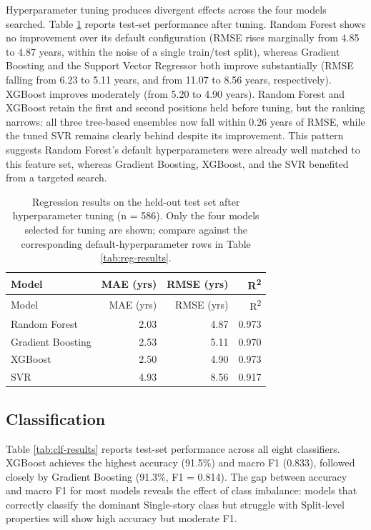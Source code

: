 \documentclass[11pt,a4paper]{article}
\begin{document}
Hyperparameter tuning produces divergent effects across the four models
searched. Table \ref{tab:reg-tuned} reports test-set performance after
tuning. Random Forest shows no improvement over its default
configuration (RMSE rises marginally from 4.85 to 4.87 years, within the
noise of a single train/test split), whereas Gradient Boosting and the
Support Vector Regressor both improve substantially (RMSE falling from
6.23 to 5.11 years, and from 11.07 to 8.56 years, respectively). XGBoost
improves moderately (from 5.20 to 4.90 years). Random Forest and XGBoost
retain the first and second positions held before tuning, but the
ranking narrows: all three tree-based ensembles now fall within 0.26
years of RMSE, while the tuned SVR remains clearly behind despite its
improvement. This pattern suggests Random Forest's default
hyperparameters were already well matched to this feature set, whereas
Gradient Boosting, XGBoost, and the SVR benefited from a targeted
search.

\begin{longtable}[]{@{}lrrr@{}}
\caption{\label{tab:reg-tuned}Regression results on the held-out test
set after hyperparameter tuning (n = 586). Only the four models selected
for tuning are shown; compare against the corresponding
default-hyperparameter rows in Table
\ref{tab:reg-results}.}\tabularnewline
\toprule\noalign{}
Model & MAE (yrs) & RMSE (yrs) & R\textsuperscript{2} \\
\midrule\noalign{}
\endfirsthead
\toprule\noalign{}
Model & MAE (yrs) & RMSE (yrs) & R\textsuperscript{2} \\
\midrule\noalign{}
\endhead
\bottomrule\noalign{}
\endlastfoot
Random Forest & 2.03 & 4.87 & 0.973 \\
Gradient Boosting & 2.53 & 5.11 & 0.970 \\
XGBoost & 2.50 & 4.90 & 0.973 \\
SVR & 4.93 & 8.56 & 0.917 \\
\end{longtable}

\subsection{Classification}\label{classification}

Table \ref{tab:clf-results} reports test-set performance across all
eight classifiers. XGBoost achieves the highest accuracy (91.5\%) and
macro F1 (0.833), followed closely by Gradient Boosting (91.3\%, F1 =
0.814). The gap between accuracy and macro F1 for most models reveals
the effect of class imbalance: models that correctly classify the
dominant Single-story class but struggle with Split-level properties
will show high accuracy but moderate F1.
\end{document}
